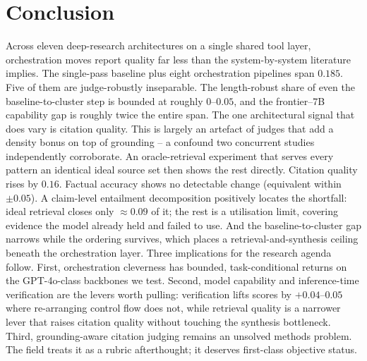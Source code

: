 \documentclass[11pt]{article}
\begin{document}
\section{Conclusion}\label{sec:conclusion}
Across eleven deep-research architectures on a single shared tool layer, orchestration
moves report quality far less than the system-by-system literature implies. The single-pass
baseline plus eight orchestration pipelines span $0.185$. Five of them are judge-robustly
inseparable. The length-robust share of even the baseline-to-cluster step is bounded at
roughly $0$--$0.05$, and the frontier--7B capability gap is roughly twice the entire span. The one architectural signal that does
vary is citation quality. This is largely an artefact of judges that add a density bonus on top
of grounding -- a confound two concurrent studies independently corroborate. An oracle-retrieval
experiment that serves every pattern an identical ideal source set then shows the rest directly.
Citation quality rises by $0.16$. Factual accuracy shows no detectable change (equivalent
within $\pm0.05$). A claim-level entailment decomposition positively locates the shortfall:
ideal retrieval closes only $\approx\!0.09$ of it; the rest is a utilisation limit, covering
evidence the model already held and failed to use. And the
baseline-to-cluster gap narrows while the ordering survives, which places a
retrieval-and-synthesis ceiling beneath the orchestration layer. Three implications for
the research agenda follow. First, orchestration cleverness has bounded, task-conditional returns
on the GPT-4o-class backbones we test. Second, model capability and inference-time verification are the
levers worth pulling: verification lifts scores by $+0.04$--$0.05$ where re-arranging
control flow does not, while retrieval quality is a narrower lever that raises citation
quality without touching the synthesis bottleneck. Third,
grounding-aware
citation judging remains an unsolved methods problem. The field treats it as a
rubric afterthought; it deserves first-class objective status.
\end{document}
